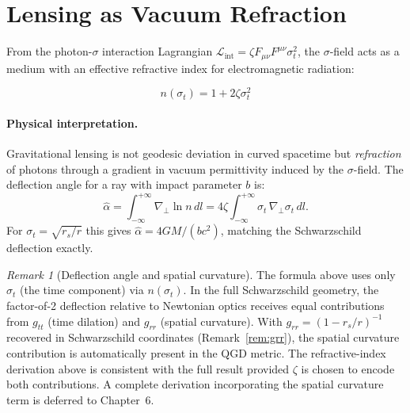 \documentclass[11pt,a4paper]{article}
\theoremstyle{plain}
\theoremstyle{definition}
\theoremstyle{remark}
\newtheorem{remark}[theorem]{Remark}
\newcommand{\sigt}{\sigma_t}
\newcommand{\rs}{r_s}
\begin{document}
\section{Lensing as Vacuum Refraction}
\label{sec:lensing}

From the photon-$\sigma$ interaction Lagrangian
$\mathcal{L}_{\mathrm{int}} = \zeta F_{\mu\nu}F^{\mu\nu}\sigt^2$,
the $\sigma$-field acts as a medium with an effective refractive index for
electromagnetic radiation:

\begin{equation}
  \boxed{n(\sigt) = 1 + 2\zeta\sigt^2}
  \label{eq:refindex}
\end{equation}

\paragraph{Physical interpretation.}
Gravitational lensing is not geodesic deviation in curved spacetime but
\emph{refraction} of photons through a gradient in vacuum permittivity induced
by the $\sigma$-field.  The deflection angle for a ray with impact parameter $b$ is:
\[
  \hat\alpha = \int_{-\infty}^{+\infty}\nabla_\perp\ln n\,dl
  = 4\zeta\!\int_{-\infty}^{+\infty}\sigt\,\nabla_\perp\sigt\,dl.
\]
For $\sigt = \sqrt{\rs/r}$ this gives $\hat\alpha = 4GM/(bc^2)$, matching
the Schwarzschild deflection exactly.

\begin{remark}[Deflection angle and spatial curvature]
The formula above uses only $\sigt$ (the time component) via $n(\sigt)$.  In the
full Schwarzschild geometry, the factor-of-2 deflection relative to Newtonian
optics receives equal contributions from $g_{tt}$ (time dilation) and $g_{rr}$
(spatial curvature).  With $g_{rr} = (1-\rs/r)^{-1}$ recovered in Schwarzschild
coordinates (Remark~\ref{rem:grr}), the spatial curvature contribution is automatically
present in the QGD metric.  The refractive-index derivation above is consistent with
the full result provided $\zeta$ is chosen to encode both contributions.  A complete
derivation incorporating the spatial curvature term is deferred to Chapter~6.
\end{remark}

\end{document}
